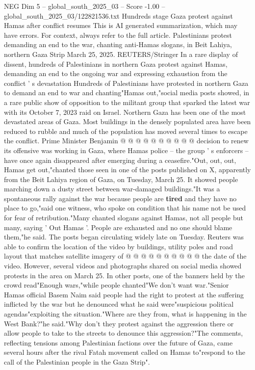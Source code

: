 \begin{textsample}{NEG Dim 5 – global\_south\_2025\_03 – Score -1.00 – global\_south\_2025\_03/122821536.txt}  \label{ex:f5_neg_274}
Hundreds stage Gaza protest against Hamas after conflict resumes This is AI generated summarization, which may have errors.
For context, always refer to the full article.
Palestinians protest demanding an end to the war, chanting anti-Hamas slogans, in Beit Lahiya, northern Gaza Strip March 25, 2025.
REUTERS/Stringer In a rare display of dissent, hundreds of Palestinians in northern Gaza protest against Hamas, demanding an end to the ongoing war and expressing exhaustion from the conflict ' s devastation Hundreds of Palestinians have protested in northern Gaza to demand an end to war and chanting"Hamas out,"social media posts showed, in a rare public show of opposition to the militant group that sparked the latest war with its October 7, 2023 raid on Israel.
Northern Gaza has been one of the most devastated areas of Gaza.
Most buildings in the densely populated area have been reduced to rubble and much of the population has moved several times to escape the conflict.
Prime Minister Benjamin @ @ @ @ @ @ @ @ @ @ decision to renew its offensive was working in Gaza, where Hamas police -- the group ' s enforcers -- have once again disappeared after emerging during a ceasefire."Out, out, out, Hamas get out,"chanted those seen in one of the posts published on X, apparently from the Beit Lahiya region of Gaza, on Tuesday, March 25.
It showed people marching down a dusty street between war-damaged buildings."It was a spontaneous rally against the war because people are \textbf{tired} and they have no place to go,"said one witness, who spoke on condition that his name not be used for fear of retribution."Many chanted slogans against Hamas, not all people but many, saying ' Out Hamas '.
People are exhausted and no one should blame them,"he said.
The posts began circulating widely late on Tuesday.
Reuters was able to confirm the location of the video by buildings, utility poles and road layout that matches satellite imagery of @ @ @ @ @ @ @ @ @ @ the date of the video.
However, several videos and photographs shared on social media showed protests in the area on March 25.
In other posts, one of the banners held by the crowd read"Enough wars,"while people chanted"We don't want war."Senior Hamas official Basem Naim said people had the right to protest at the suffering inflicted by the war but he denounced what he said were"suspicious political agendas"exploiting the situation."Where are they from, what is happening in the West Bank?"he said."Why don't they protest against the aggression there or allow people to take to the streets to denounce this aggression?"The comments, reflecting tensions among Palestinian factions over the future of Gaza, came several hours after the rival Fatah movement called on Hamas to"respond to the call of the Palestinian people in the Gaza Strip".

\end{textsample}
